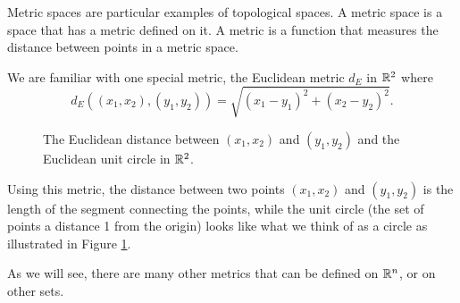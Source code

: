  \label{chap:metric_spaces}


\vspace*{-17 pt}

\vspace*{13 pt}

\label{sec_metric_space_intro}

Metric spaces are particular examples of topological spaces. A metric space is a space that has a metric defined on it. A metric is a function that measures the distance between points in a metric space. 

We are familiar with one special metric, the Euclidean metric $d_E$ in $\mathbb{R}^2$ where 
\[d_E((x_1,x_2),(y_1,y_2)) = \sqrt{(x_1-y_1)^2 + (x_2-y_2)^2}.\]
\begin{figure}[ht]
\begin{center}
\end{center}
\caption{The Euclidean distance between $(x_1,x_2)$ and $(y_1,y_2)$ and the Euclidean unit circle in $\mathbb{R}^2$.}
\label{F:Euclidean_metric}
\end{figure}
Using this metric, the distance between two points $(x_1,x_2)$ and $(y_1,y_2)$ is the length of the segment connecting the points, while the unit circle (the set of points a distance 1 from the origin) looks like what we think of as a circle as illustrated in Figure \ref{F:Euclidean_metric}.

As we will see, there are many other metrics that can be defined on $\mathbb{R}^n$, or on other sets. 

